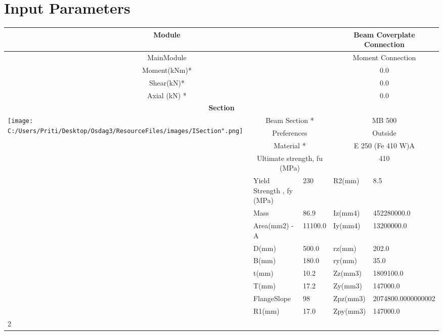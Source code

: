 \documentclass{article}%
\begin{document}
%
\normalsize%
\pagestyle{header}%
\section{Input Parameters}%
\label{sec:InputParameters}%
\renewcommand{\arraystretch}{1.2}%
\begin{longtable}{|p{5cm}|p{2cm}|p{2cm}|p{2cm}|p{5cm}|}%
\hline%
\hline%
\multicolumn{3}{|c|}{Module}&\multicolumn{2}{|c|}{Beam Coverplate Connection}\\%
\hline%
\hline%
\multicolumn{3}{|c|}{MainModule}&\multicolumn{2}{|c|}{Moment Connection}\\%
\hline%
\hline%
\multicolumn{3}{|c|}{Moment(kNm)*}&\multicolumn{2}{|c|}{0.0}\\%
\hline%
\hline%
\multicolumn{3}{|c|}{Shear(kN)*}&\multicolumn{2}{|c|}{0.0}\\%
\hline%
\hline%
\multicolumn{3}{|c|}{Axial (kN) *}&\multicolumn{2}{|c|}{0.0}\\%
\hline%
\hline%
\multicolumn{5}{|c|}{\textbf{Section}}\\%
\hline%
\hline%
\multirow{13}{*}{\texttt{[image: C:/Users/Priti/Desktop/Osdag3/ResourceFiles/images/ISection".png]}}&\multicolumn{2}{|c|}{Beam Section *}&\multicolumn{2}{|c|}{MB 500}\\%
\cline{2%
-%
5}%
&\multicolumn{2}{|c|}{Preferences}&\multicolumn{2}{|c|}{Outside}\\%
\cline{2%
-%
5}%
&\multicolumn{2}{|c|}{Material *}&\multicolumn{2}{|c|}{E 250 (Fe 410 W)A}\\%
\cline{2%
-%
5}%
&\multicolumn{2}{|c|}{Ultimate strength, fu (MPa)}&\multicolumn{2}{|c|}{410}\\%
\cline{2%
-%
5}%
&Yield Strength , fy (MPa)&230&R2(mm)&8.5\\%
\cline{2%
-%
5}%
&Mass&86.9&Iz(mm4)&452280000.0\\%
\cline{2%
-%
5}%
&Area(mm2) {-} A&11100.0&Iy(mm4)&13200000.0\\%
\cline{2%
-%
5}%
&D(mm)&500.0&rz(mm)&202.0\\%
\cline{2%
-%
5}%
&B(mm)&180.0&ry(mm)&35.0\\%
\cline{2%
-%
5}%
&t(mm)&10.2&Zz(mm3)&1809100.0\\%
\cline{2%
-%
5}%
&T(mm)&17.2&Zy(mm3)&147000.0\\%
\cline{2%
-%
5}%
&FlangeSlope&98&Zpz(mm3)&2074800.0000000002\\%
\cline{2%
-%
5}%
&R1(mm)&17.0&Zpy(mm3)&147000.0\\%
\cline{2%
}
\end{longtable}
\end{document}

